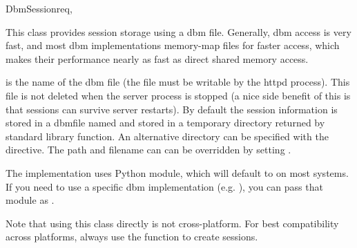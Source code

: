 \begin{classdesc}{DbmSession}{req, }

  This class provides session storage using a dbm file. Generally, dbm
  access is very fast, and most dbm implementations memory-map files
  for faster access, which makes their performance nearly as fast as
  direct shared memory access.

   is the name of the dbm file (the file must be writable by
  the httpd process). This file is not deleted when the server process
  is stopped (a nice side benefit of this is that sessions can survive
  server restarts). By default the session information is stored in a
  dbmfile named  and stored in a temporary directory
  returned by  standard library
  function. An alternative directory can be specified with the  
   directive.  
  The path and filename can can be overridden by setting .

  The implementation uses Python  module, which will
  default to  on most systems. If you need to use a
  specific dbm implementation (e.g. ), you can pass that
  module as .

  Note that using this class directly is not cross-platform. For best
  compatibility across platforms, always use the 
  function to create sessions.

\end{classdesc}

